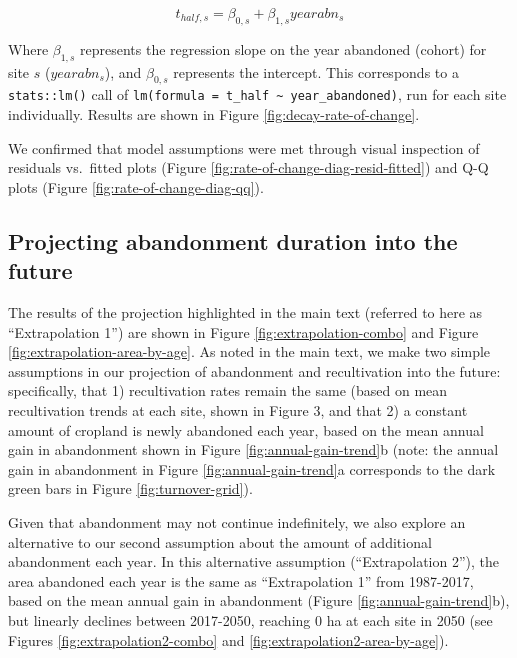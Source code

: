 \documentclass[
]{article}
\begin{document}
\begin{equation}
t_{half,s} = \beta_{0,s} + \beta_{1,s} yearabn_{s} \label{eq:rate-of-change-lm}
\end{equation}

Where \(\beta_{1,s}\) represents the regression slope on the year abandoned (cohort) for site \(s\) (\(yearabn_{s}\)), and \(\beta_{0,s}\) represents the intercept.
This corresponds to a \texttt{stats::lm()} call of \texttt{lm(formula\ =\ t\_half\ \textasciitilde{}\ year\_abandoned)}, run for each site individually.
Results are shown in Figure \ref{fig:decay-rate-of-change}.

We confirmed that model assumptions were met through visual inspection of residuals vs.~fitted plots (Figure \ref{fig:rate-of-change-diag-resid-fitted}) and Q-Q plots (Figure \ref{fig:rate-of-change-diag-qq}).

\hypertarget{section-extrapolation-si}{%
\subsection{Projecting abandonment duration into the future}\label{section-extrapolation-si}}

The results of the projection highlighted in the main text (referred to here as ``Extrapolation 1'') are shown in Figure \ref{fig:extrapolation-combo} and Figure \ref{fig:extrapolation-area-by-age}.
As noted in the main text, we make two simple assumptions in our projection of abandonment and recultivation into the future: specifically, that 1) recultivation rates remain the same (based on mean recultivation trends at each site, shown in Figure 3, and that 2) a constant amount of cropland is newly abandoned each year, based on the mean annual gain in abandonment shown in Figure \ref{fig:annual-gain-trend}b (note: the annual gain in abandonment in Figure \ref{fig:annual-gain-trend}a corresponds to the dark green bars in Figure \ref{fig:turnover-grid}).

Given that abandonment may not continue indefinitely, we also explore an alternative to our second assumption about the amount of additional abandonment each year.
In this alternative assumption (``Extrapolation 2''), the area abandoned each year is the same as ``Extrapolation 1'' from 1987-2017, based on the mean annual gain in abandonment (Figure \ref{fig:annual-gain-trend}b), but linearly declines between 2017-2050, reaching 0 ha at each site in 2050 (see Figures \ref{fig:extrapolation2-combo} and \ref{fig:extrapolation2-area-by-age}).
\end{document}
